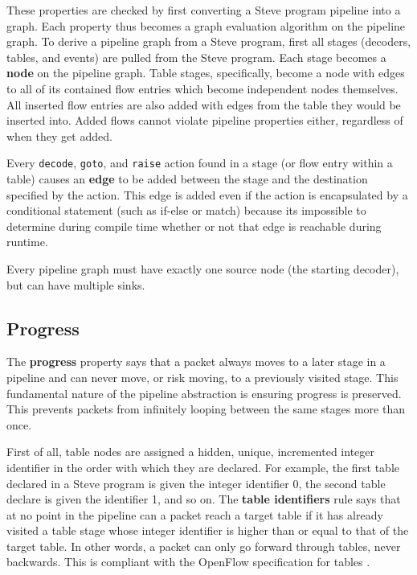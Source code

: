 These properties are checked by first converting a Steve program pipeline into a graph. Each property thus becomes a graph evaluation algorithm on the pipeline graph. To derive a pipeline graph from a Steve program, first all stages (decoders, tables, and events) are pulled from the Steve program. Each stage becomes a \textbf{node} on the pipeline graph. Table stages, specifically, become a node with edges to all of its contained flow entries which become independent nodes themselves. All inserted flow entries are also added with edges from the table they would be inserted into. Added flows cannot violate pipeline properties either, regardless of when they get added.

Every \texttt{decode}, \texttt{goto}, and \texttt{raise} action found in a stage (or flow entry within a table) causes an \textbf{edge} to be added between the stage and the destination specified by the action. This edge is added even if the action is encapsulated by a conditional statement (such as if-else or match) because its impossible to determine during compile time whether or not that edge is reachable during runtime. 

Every pipeline graph must have exactly one source node (the starting decoder), but can have multiple sinks.

\subsection{Progress} \label{progress_guide}

The \textbf{progress} property says that a packet always moves to a later stage in a pipeline and can never move, or risk moving, to a previously visited stage. This fundamental nature of the pipeline abstraction is ensuring progress is preserved. This prevents packets from infinitely looping between the same stages more than once. 

First of all, table nodes are assigned a hidden, unique, incremented integer identifier in the order with which they are declared. For example, the first table declared in a Steve program is given the integer identifier 0, the second table declare is given the identifier 1, and so on. The \textbf{table identifiers} rule says that at no point in the pipeline can a packet reach a target table if it has already visited a table stage whose integer identifier is higher than or equal to that of the target table. In other words, a packet can only go forward through tables, never backwards. This is compliant with the OpenFlow specification for tables \cite{openflow_spec}.

